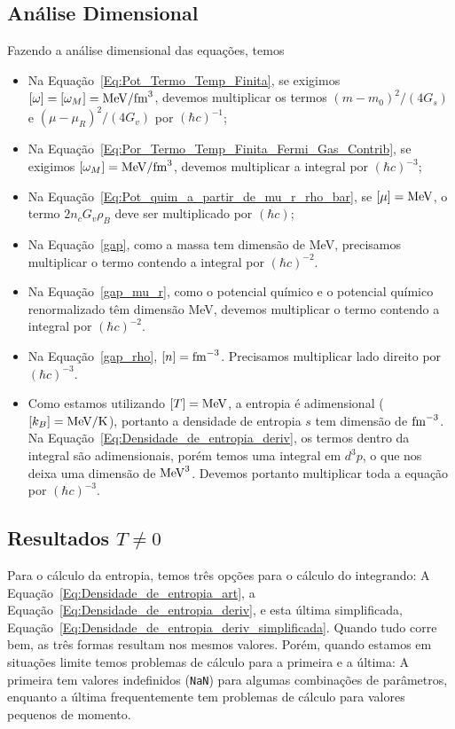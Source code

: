 \subsection{Análise Dimensional}

Fazendo a análise dimensional das equações, temos
\begin{itemize}
	\item Na Equação~\eqref{Eq:Pot_Termo_Temp_Finita}, se exigimos $[\omega] = [\omega_M] = \rm{MeV}/\rm{fm}^3$, devemos multiplicar os termos $(m - m_0)^2/(4G_s)$ e $(\mu - \mu_R)^2/(4G_v)$ por $(\hbar c)^{-1}$;
	\item Na Equação~\eqref{Eq:Por_Termo_Temp_Finita_Fermi_Gas_Contrib}, se exigimos $[\omega_M] = \rm{MeV}/\rm{fm}^3$, devemos multiplicar a integral por $(\hbar c)^{-3}$;
	\item Na Equação~\eqref{Eq:Pot_quim_a_partir_de_mu_r_rho_bar}, se $[\mu] = \rm{MeV}$, o termo $2 n_c G_v \rho_B$ deve ser multiplicado por $(\hbar c)$;
	\item Na Equação~\eqref{gap}, como a massa tem dimensão de MeV, precisamos multiplicar o termo contendo a integral por $(\hbar c)^{-2}$.
	\item Na Equação~\eqref{gap_mu_r}, como o potencial químico e o potencial químico renormalizado têm dimensão MeV, devemos multiplicar o termo contendo a integral por $(\hbar c)^{-2}$.
	\item Na Equação~\eqref{gap_rho}, $[n] = \rm{fm}^{-3}$. Precisamos multiplicar lado direito por $(\hbar c)^{-3}$.
	\item Como estamos utilizando $[T] = \rm{MeV}$, a entropia é adimensional ($[k_B] = \textrm{MeV}/\rm{K}$), portanto a densidade de entropia $s$ tem dimensão de $\rm{fm}^{-3}$. Na Equação~\eqref{Eq:Densidade_de_entropia_deriv}, os termos dentro da integral são adimensionais, porém temos uma integral em $d^3p$, o que nos deixa uma dimensão de $\rm{MeV}^3$. Devemos portanto multiplicar toda a equação por $(\hbar c)^{-3}$.
\end{itemize}

\subsection{Resultados $T \neq 0$}

Para o cálculo da entropia, temos três opções para o cálculo do integrando: A Equação~\eqref{Eq:Densidade_de_entropia_art}, a Equação~\eqref{Eq:Densidade_de_entropia_deriv}, e esta última simplificada, Equação~\eqref{Eq:Densidade_de_entropia_deriv_simplificada}. Quando tudo corre bem, as três formas resultam nos mesmos valores. Porém, quando estamos em situações limite temos problemas de cálculo para a primeira e a última: A primeira tem valores indefinidos (\texttt{NaN}) para algumas combinações de parâmetros, enquanto a última frequentemente tem problemas de cálculo para valores pequenos de momento.

